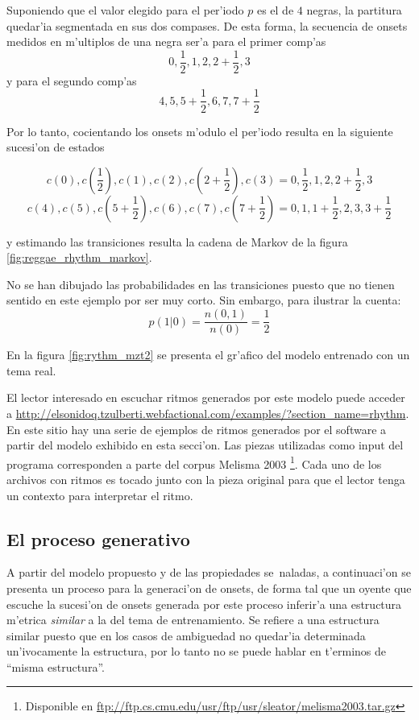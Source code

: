 Suponiendo que el valor elegido para el per'iodo $p$ es el de $4$ negras, la partitura quedar'ia segmentada en sus dos compases. 
De esta forma, la secuencia de onsets medidos en m'ultiplos de una negra ser'a para el primer comp'as
$$0, \frac{1}{2}, 1, 2, 2+\frac{1}{2}, 3$$
y para el segundo comp'as 
$$4, 5, 5+\frac{1}{2}, 6, 7, 7+\frac{1}{2}$$

Por lo tanto, cocientando los onsets m'odulo el per'iodo resulta en la siguiente sucesi'on de estados

$$c(0), c(\frac{1}{2}), c(1), c(2), c(2+\frac{1}{2}), c(3) = 0, \frac{1}{2}, 1, 2, 2+\frac{1}{2}, 3$$
$$c(4), c(5), c(5+\frac{1}{2}), c(6), c(7), c(7+\frac{1}{2}) = 0, 1, 1+\frac{1}{2}, 2, 3, 3+\frac{1}{2}$$

y estimando las transiciones resulta la cadena de Markov de la figura \ref{fig:reggae_rhythm_markov}.
\begin{imagen}
\end{imagen}

No se han dibujado las probabilidades en las transiciones puesto que no tienen sentido en este ejemplo por ser muy corto. Sin embargo, para ilustrar la cuenta:
$$p(1|0) = \frac{n(0, 1)}{n(0)} = \frac{1}{2}$$

En la figura \ref{fig:rythm_mzt2} se presenta el gr'afico del modelo entrenado con un tema real.
\begin{imagen}
    \width{5cm}
\end{imagen}

El lector interesado en escuchar ritmos generados por este modelo puede acceder a \url{http://elsonidoq.tzulberti.webfactional.com/examples/?section_name=rhythm}. 
En este sitio hay una serie de ejemplos de ritmos generados por el software a partir del modelo exhibido en esta secci'on. Las piezas 
utilizadas como input del programa corresponden a parte del corpus Melisma 2003 \footnote{Disponible en 
\url{ftp://ftp.cs.cmu.edu/usr/ftp/usr/sleator/melisma2003.tar.gz}}. Cada uno de los archivos con ritmos es tocado junto con la 
pieza original para que el lector tenga un contexto para interpretar el ritmo. 

\subsection{El proceso generativo}
A partir del modelo propuesto y de las propiedades se~naladas, a continuaci'on se presenta un proceso para la generaci'on de onsets, de forma tal 
que un oyente que escuche la sucesi'on de onsets generada por este proceso inferir'a una estructura m'etrica \emph{similar} a la del tema de 
entrenamiento. Se refiere a una estructura similar puesto que en los casos de ambiguedad no quedar'ia determinada un'ivocamente la estructura, por lo tanto
no se puede hablar en t'erminos de ``misma estructura''.

